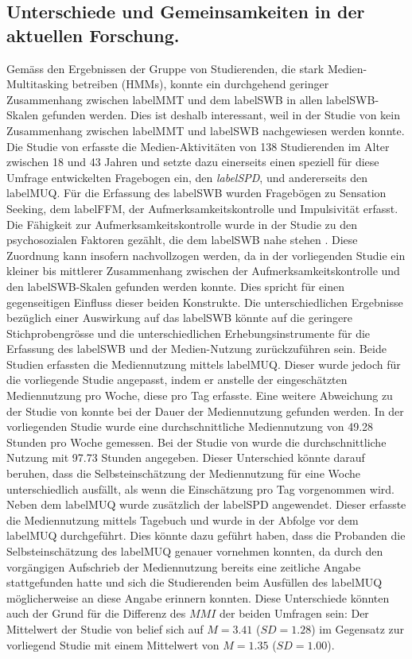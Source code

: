 \subsection{Unterschiede und Gemeinsamkeiten in der aktuellen Forschung.} Ge\-mäss den Ergebnissen der Gruppe von Studierenden, die stark Medien-Multitasking betreiben (HMMs), konnte ein durchgehend geringer Zusammenhang zwischen \gls{labelMMT} und dem \gls{labelSWB} in allen \gls{labelSWB}-Skalen gefunden werden. Dies ist deshalb interessant, weil in der Studie von  kein Zusammenhang zwischen \gls{labelMMT} und \gls{labelSWB} nachgewiesen werden konnte. Die Studie von \citeauthor{Shih2013} erfasste die Medien-Aktivitäten von 138 Studierenden im Alter zwischen 18 und 43 Jahren und setzte dazu einerseits einen speziell für diese Umfrage entwickelten Fragebogen ein, den \textit{\gls{labelSPD}}, und andererseits den \gls{labelMUQ}. Für die Erfassung des \gls{labelSWB} wurden Fragebögen zu Sensation Seeking, dem \gls{labelFFM}, der Aufmerksamkeitskontrolle und Impulsivität erfasst. Die Fähigkeit zur Aufmerksamkeitskontrolle wurde in der Studie zu den psychosozialen Faktoren gezählt, die dem \gls{labelSWB} nahe stehen \cite{Fergus2012}. Diese Zuordnung kann insofern nachvollzogen werden, da in der vorliegenden Studie ein kleiner bis mittlerer Zusammenhang zwischen der Aufmerksamkeitskontrolle und den \gls{labelSWB}-Skalen gefunden werden konnte. Dies spricht für einen gegenseitigen Einfluss dieser beiden Konstrukte. Die unterschiedlichen Ergebnisse bezüglich einer Auswirkung auf das \gls{labelSWB} könnte auf die geringere Stichprobengrösse und die unterschiedlichen Erhebungsinstrumente für die Erfassung des \gls{labelSWB} und der Medien-Nutzung zurückzuführen sein. Beide Studien erfassten die Mediennutzung mittels \gls{labelMUQ}. Dieser wurde jedoch für die vorliegende Studie angepasst, indem er anstelle der eingeschätzten Mediennutzung pro Woche, diese pro Tag erfasste. Eine weitere Abweichung zu der Studie von  konnte bei der Dauer der Mediennutzung gefunden werden. In der vorliegenden Studie wurde eine durchschnittliche Mediennutzung von 49.28 Stunden pro Woche gemessen. Bei der Studie von \citeauthor{Shih2013} wurde die durchschnittliche Nutzung mit 97.73 Stunden angegeben. Dieser Unterschied könnte darauf beruhen, dass die Selbsteinschätzung der Mediennutzung für eine Woche unterschiedlich ausfällt, als wenn die Einschätzung pro Tag vorgenommen wird. Neben dem \gls{labelMUQ} wurde zusätzlich der \gls{labelSPD} angewendet. Dieser erfasste die Mediennutzung mittels Tagebuch und wurde in der Abfolge vor dem \gls{labelMUQ} durchgeführt. Dies könnte dazu geführt haben, dass die Probanden die Selbsteinschätzung des \gls{labelMUQ} genauer vornehmen konnten, da durch den vorgängigen Aufschrieb der Mediennutzung bereits eine zeitliche Angabe stattgefunden hatte und sich die Studierenden beim Ausfüllen des \gls{labelMUQ} möglicherweise an diese Angabe erinnern konnten. Diese Unterschiede könnten auch der Grund für die Differenz des $MMI$ der beiden Umfragen sein: Der Mittelwert der Studie von  belief sich auf $M=3.41$ ($SD=1.28$) im Gegensatz zur vorliegend Studie mit einem Mittelwert von $M=1.35$ ($SD=1.00$). \citeauthor{Shih2013} 